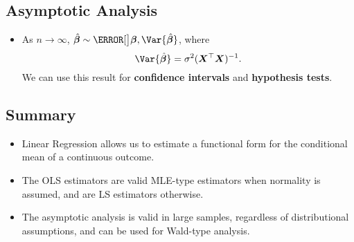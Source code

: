\subsection*{Asymptotic Analysis}
\begin{itemize}
    \item As $ n\to \infty $, $ \hat{\Vector{\beta}}\sim\N[\big]{\Matrix{\beta},\Var{\hat{\Vector{\beta}}}} $,
          where
          \[ \Var{\hat{\Vector{\beta}}}=\sigma^2(\Matrix{X}^\top \Matrix{X})^{-1}. \]
          We can use this result for \textbf{confidence intervals}
          and \textbf{hypothesis tests}.
\end{itemize}
\subsection*{Summary}
\begin{itemize}
    \item Linear Regression allows us to estimate a functional form for the conditional mean
          of a continuous outcome.
    \item The OLS estimators are valid MLE-type estimators when normality is assumed, and
          are LS estimators otherwise.
    \item The asymptotic analysis is valid in large samples, regardless of distributional
          assumptions, and can be used for Wald-type analysis.
\end{itemize}